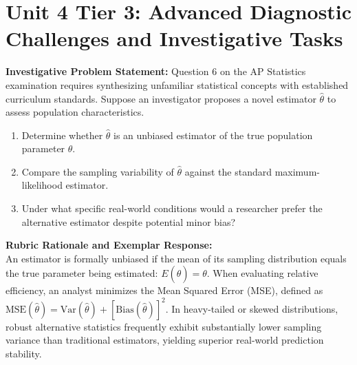 \section{Unit 4 Tier 3: Advanced Diagnostic Challenges and Investigative Tasks}
\begin{frqrubricbox}
\textbf{Investigative Problem Statement:} Question 6 on the AP Statistics examination requires synthesizing unfamiliar statistical concepts with established curriculum standards. Suppose an investigator proposes a novel estimator $\hat{\theta}$ to assess population characteristics.
\begin{enumerate}[label=(\alph*)]
  \item Determine whether $\hat{\theta}$ is an unbiased estimator of the true population parameter $\theta$.
  \item Compare the sampling variability of $\hat{\theta}$ against the standard maximum-likelihood estimator.
  \item Under what specific real-world conditions would a researcher prefer the alternative estimator despite potential minor bias?
\end{enumerate}
\textbf{Rubric Rationale and Exemplar Response:}\\
An estimator is formally unbiased if the mean of its sampling distribution equals the true parameter being estimated: $E(\hat{\theta}) = \theta$. When evaluating relative efficiency, an analyst minimizes the Mean Squared Error (MSE), defined as $\text{MSE}(\hat{\theta}) = \text{Var}(\hat{\theta}) + [\text{Bias}(\hat{\theta})]^2$. In heavy-tailed or skewed distributions, robust alternative statistics frequently exhibit substantially lower sampling variance than traditional estimators, yielding superior real-world prediction stability.
\end{frqrubricbox}\vspace{6pt}

